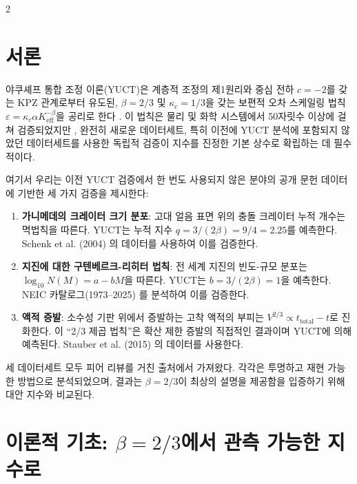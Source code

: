 \documentclass[11pt,a4paper]{article}
\newcommand{\eps}{\varepsilon}
\newcommand{\kappac}{\kappa_c}
\newcommand{\Keff}{K_{\mathrm{eff}}}
\newcommand{\betaf}{\beta}
\begin{document}
	\vspace{0.4cm}
	\vspace*{-\baselineskip}
	\begin{multicols}{2}
		
		\section{서론}
		
		야쿠셰프 통합 조정 이론(YUCT)은 계층적 조정의 제1원리와 중심 전하 \(c = -2\)를 갖는 KPZ 관계로부터 유도된, \(\betaf = 2/3\) 및 \(\kappac = 1/3\)을 갖는 보편적 오차 스케일링 법칙 \(\eps = \kappac \alpha \Keff^{-\betaf}\)을 공리로 한다 \cite{AppendixY, AppendixL}. 이 법칙은 물리 및 화학 시스템에서 50자릿수 이상에 걸쳐 검증되었지만 \cite{AppendixC, AppendixG}, 완전히 새로운 데이터세트, 특히 이전에 YUCT 분석에 포함되지 않았던 데이터세트를 사용한 독립적 검증이 지수를 진정한 기본 상수로 확립하는 데 필수적이다.
		
		여기서 우리는 이전 YUCT 검증에서 한 번도 사용되지 않은 분야의 공개 문헌 데이터에 기반한 세 가지 검증을 제시한다:
		
		\begin{enumerate}
			\item \textbf{가니메데의 크레이터 크기 분포}: 고대 얼음 표면 위의 충돌 크레이터 누적 개수는 멱법칙을 따른다. YUCT는 누적 지수 \(q = 3/(2\betaf) = 9/4 = 2.25\)를 예측한다. Schenk et al. (2004) \cite{Schenk2004}의 데이터를 사용하여 이를 검증한다.
			\item \textbf{지진에 대한 구텐베르크-리히터 법칙}: 전 세계 지진의 빈도-규모 분포는 \(\log_{10} N(M) = a - bM\)을 따른다. YUCT는 \(b = 3/(2\betaf) = 1\)을 예측한다. NEIC 카탈로그(1973–2025) \cite{USGSNEIC}를 분석하여 이를 검증한다.
			\item \textbf{액적 증발}: 소수성 기판 위에서 증발하는 고착 액적의 부피는 \(V^{2/3} \propto t_{\text{total}} - t\)로 진화한다. 이 “2/3 제곱 법칙”은 확산 제한 증발의 직접적인 결과이며 YUCT에 의해 예측된다. Stauber et al. (2015) \cite{Stauber2015}의 데이터를 사용한다.
		\end{enumerate}
		
		세 데이터세트 모두 피어 리뷰를 거친 출처에서 가져왔다. 각각은 투명하고 재현 가능한 방법으로 분석되었으며, 결과는 \(\betaf = 2/3\)이 최상의 설명을 제공함을 입증하기 위해 대안 지수와 비교된다.
		
		\section{이론적 기초: \(\betaf = 2/3\)에서 관측 가능한 지수로}
		

\end{multicols}
\end{document}
